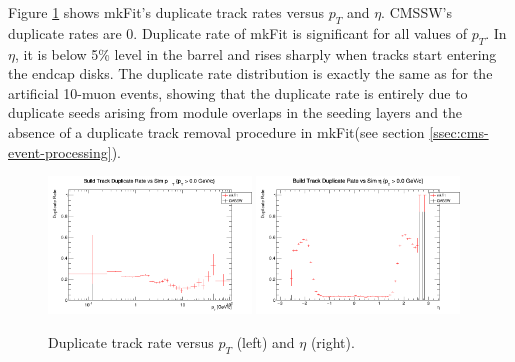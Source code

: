 \documentclass{webofc}
\def\mkfit{mkFit\xspace}
\def\GeVoc{\ensuremath{\,\rm{G}e\rm{V}/c}}
\def\twop{0.48\textwidth}
\def\postfigskip{\vskip-4mm}
\begin{document}


Figure \ref{fig:drates} shows \mkfit's duplicate track rates versus $p_T$ and
$\eta$. CMSSW's duplicate rates are 0. Duplicate rate of \mkfit is significant for all
values of $p_T$. In $\eta$, it is below 5\% level in the barrel and rises
sharply when tracks start entering the endcap disks. The duplicate rate 
distribution is exactly the same as for the artificial 10-muon events, showing that
the duplicate rate is entirely due to duplicate seeds arising from module overlaps in the
seeding layers and the absence of a duplicate track
removal procedure in \mkfit (see section \ref{ssec:cms-event-processing}).

\begin{figure}[thb]
  \centering
  \includegraphics[width=\twop]{figs/phys/SKL-SP_CMSSW_TTbar_PU70_dr_pt_logx_build_pt0p0_SIMVAL.png}
  \hfill
  \includegraphics[width=\twop]{figs/phys/SKL-SP_CMSSW_TTbar_PU70_dr_eta_build_pt0p0_SIMVAL.png}
  \postfigskip

  \caption{Duplicate track rate versus $p_T$ (left) and $\eta$ (right).}
  \label{fig:drates}
\end{figure}
\end{document}
